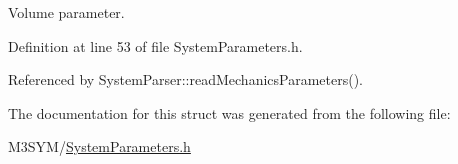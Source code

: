 Volume parameter. 



Definition at line 53 of file System\+Parameters.\+h.



Referenced by System\+Parser\+::read\+Mechanics\+Parameters().



The documentation for this struct was generated from the following file\+:\begin{DoxyCompactItemize}
\item 
M3\+S\+Y\+M/\hyperlink{SystemParameters_8h}{System\+Parameters.\+h}\end{DoxyCompactItemize}

